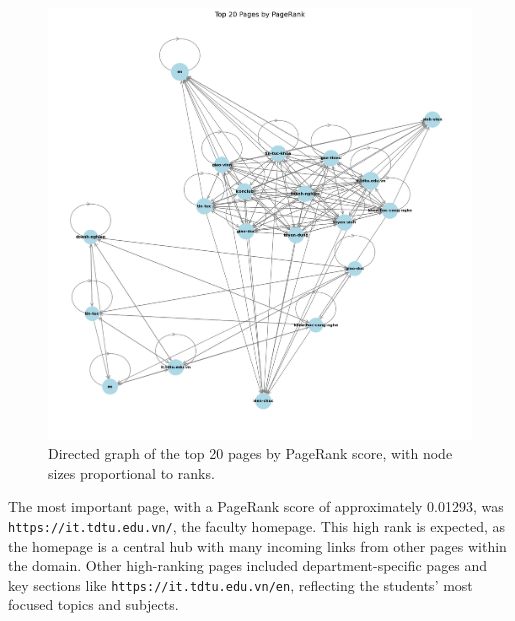 \begin{figure}[H]
    \centering
    \includegraphics[width=0.8\linewidth]{images/top_pages_web}
    \caption{Directed graph of the top 20 pages by PageRank score, with node sizes proportional to ranks.}
    \label{fig:top_pages_graph}
\end{figure}

The most important page, with a PageRank score of approximately 0.01293, was \texttt{https://it.tdtu.edu.vn/}, the faculty homepage.
This high rank is expected, as the homepage is a central hub with many incoming links from other pages within the domain.
Other high-ranking pages included department-specific pages and key sections like \texttt{https://it.tdtu.edu.vn/en}, reflecting the students' most focused topics and subjects.
